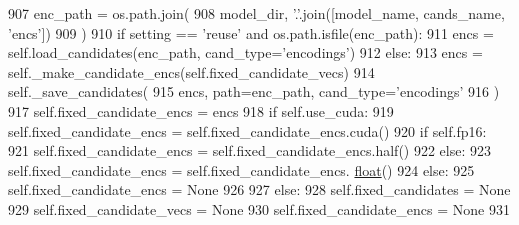 \begin{DoxyCode}
907                     enc\_path = os.path.join(
908                         model\_dir, \textcolor{stringliteral}{'.'}.join([model\_name, cands\_name, \textcolor{stringliteral}{'encs'}])
909                     )
910                     \textcolor{keywordflow}{if} setting == \textcolor{stringliteral}{'reuse'} \textcolor{keywordflow}{and} os.path.isfile(enc\_path):
911                         encs = self.load\_candidates(enc\_path, cand\_type=\textcolor{stringliteral}{'encodings'})
912                     \textcolor{keywordflow}{else}:
913                         encs = self.\_make\_candidate\_encs(self.fixed\_candidate\_vecs)
914                         self.\_save\_candidates(
915                             encs, path=enc\_path, cand\_type=\textcolor{stringliteral}{'encodings'}
916                         )
917                     self.fixed\_candidate\_encs = encs
918                     \textcolor{keywordflow}{if} self.use\_cuda:
919                         self.fixed\_candidate\_encs = self.fixed\_candidate\_encs.cuda()
920                     \textcolor{keywordflow}{if} self.fp16:
921                         self.fixed\_candidate\_encs = self.fixed\_candidate\_encs.half()
922                     \textcolor{keywordflow}{else}:
923                         self.fixed\_candidate\_encs = self.fixed\_candidate\_encs.
      \hyperlink{namespaceprojects_1_1controllable__dialogue_1_1make__control__dataset_aa2b7207688c641dbc094ab44eca27113}{float}()
924                 \textcolor{keywordflow}{else}:
925                     self.fixed\_candidate\_encs = \textcolor{keywordtype}{None}
926 
927             \textcolor{keywordflow}{else}:
928                 self.fixed\_candidates = \textcolor{keywordtype}{None}
929                 self.fixed\_candidate\_vecs = \textcolor{keywordtype}{None}
930                 self.fixed\_candidate\_encs = \textcolor{keywordtype}{None}
931 
\end{DoxyCode}
\mbox{\label{classparlai_1_1core_1_1torch__ranker__agent_1_1TorchRankerAgent_a9b90f2718c85b6373ead4cd207cfd3d8}} 

